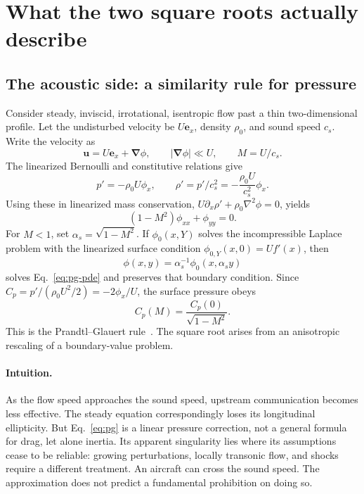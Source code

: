 \documentclass[11pt,a4paper]{article}
\numberwithin{equation}{section}
\begin{document}
\section{What the two square roots actually describe}
\label{sec:two-factors}

\subsection{The acoustic side: a similarity rule for pressure}

Consider steady, inviscid, irrotational, isentropic flow past a thin two-dimensional profile. Let the undisturbed velocity be $U\bm e_x$, density $\rho_0$, and sound speed $c_s$. Write the velocity as
\begin{equation}
 \bm u=U\bm e_x+\bm\nabla\phi,
 \qquad |\bm\nabla\phi|\ll U,
 \qquad M=U/c_s.
\end{equation}
The linearized Bernoulli and constitutive relations give
\begin{equation}
 p'=-\rho_0 U\phi_x,\qquad
 \rho'=p'/c_s^2=-\frac{\rho_0 U}{c_s^2}\phi_x.
\end{equation}
Using these in linearized mass conservation,
$U\partial_x\rho'+\rho_0\nabla^2\phi=0$, yields
\begin{equation}
 (1-M^2)\phi_{xx}+\phi_{yy}=0.
 \label{eq:pg-pde}
\end{equation}
For $M<1$, set $\alpha_s=\sqrt{1-M^2}$. If $\phi_0(x,Y)$ solves the incompressible Laplace problem with the linearized surface condition $\phi_{0,Y}(x,0)=U f'(x)$, then
\begin{equation}
 \phi(x,y)=\alpha_s^{-1}\phi_0(x,\alpha_s y)
 \label{eq:pg-transform}
\end{equation}
solves Eq.~\eqref{eq:pg-pde} and preserves that boundary condition. Since
$C_p=p'/(\rho_0U^2/2)=-2\phi_x/U$, the surface pressure obeys
\begin{equation}
 \boxed{C_p(M)=\frac{C_p(0)}{\sqrt{1-M^2}}.}
 \label{eq:pg}
\end{equation}
This is the Prandtl--Glauert rule~\cite{glauert,mit}. The square root arises from an anisotropic rescaling of a boundary-value problem.

\paragraph{Intuition.}
As the flow speed approaches the sound speed, upstream communication becomes less effective. The steady equation correspondingly loses its longitudinal ellipticity. But Eq.~\eqref{eq:pg} is a linear pressure correction, not a general formula for drag, let alone inertia. Its apparent singularity lies where its assumptions cease to be reliable: growing perturbations, locally transonic flow, and shocks require a different treatment. An aircraft can cross the sound speed. The approximation does not predict a fundamental prohibition on doing so.
\end{document}
